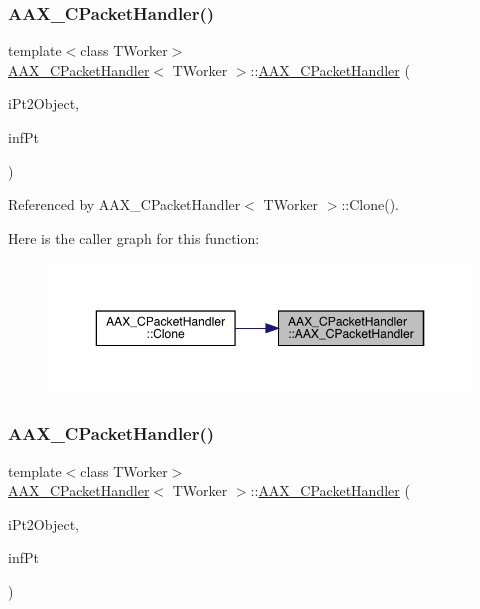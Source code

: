 \subsubsection{\texorpdfstring{AAX\_CPacketHandler()}{AAX\_CPacketHandler()}\hspace{0.1cm}{\footnotesize\ttfamily [1/2]}}
{\footnotesize\ttfamily template$<$class T\+Worker$>$ \\
\mbox{\hyperlink{a01525}{A\+A\+X\+\_\+\+C\+Packet\+Handler}}$<$ T\+Worker $>$\+::\mbox{\hyperlink{a01525}{A\+A\+X\+\_\+\+C\+Packet\+Handler}} (\begin{DoxyParamCaption}\item[{T\+Worker $\ast$}]{i\+Pt2\+Object,  }\item[{f\+Pt2\+Fn}]{inf\+Pt }\end{DoxyParamCaption})\hspace{0.3cm}{\ttfamily [inline]}}



Referenced by A\+A\+X\+\_\+\+C\+Packet\+Handler$<$ T\+Worker $>$\+::\+Clone().

Here is the caller graph for this function\+:
\nopagebreak
\begin{figure}[H]
\begin{center}
\leavevmode
\includegraphics[width=350pt]{a01525_a9199efa88f418df9c8e5caade283c147_icgraph}
\end{center}
\end{figure}
\mbox{\label{a01525_aed86dcf0713ac1a983f6795170812c52}} 
\subsubsection{\texorpdfstring{AAX\_CPacketHandler()}{AAX\_CPacketHandler()}\hspace{0.1cm}{\footnotesize\ttfamily [2/2]}}
{\footnotesize\ttfamily template$<$class T\+Worker$>$ \\
\mbox{\hyperlink{a01525}{A\+A\+X\+\_\+\+C\+Packet\+Handler}}$<$ T\+Worker $>$\+::\mbox{\hyperlink{a01525}{A\+A\+X\+\_\+\+C\+Packet\+Handler}} (\begin{DoxyParamCaption}\item[{T\+Worker $\ast$}]{i\+Pt2\+Object,  }\item[{f\+Pt2\+Fn\+Ex}]{inf\+Pt }\end{DoxyParamCaption})\hspace{0.3cm}{\ttfamily [inline]}}



